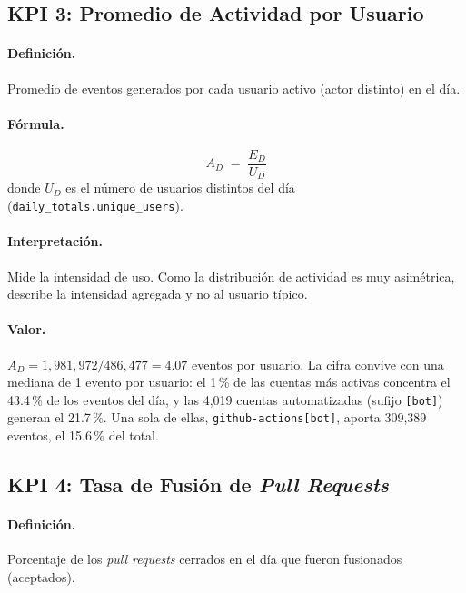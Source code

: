 
\subsection{KPI 3: Promedio de Actividad por Usuario}

\paragraph{Definición.} Promedio de eventos generados por cada usuario activo (actor distinto) en el día.

\paragraph{Fórmula.}
\[
A_D \;=\; \frac{E_D}{U_D}
\]
donde $U_D$ es el número de usuarios distintos del día (\texttt{daily\_totals.unique\_users}).

\paragraph{Interpretación.} Mide la intensidad de uso. Como la distribución de actividad es muy asimétrica, describe la intensidad agregada y no al usuario típico.

\paragraph{Valor.} $A_D = 1{,}981{,}972 / 486{,}477 = 4.07$ eventos por usuario. La cifra convive con una mediana de 1 evento por usuario: el 1\,\% de las cuentas más activas concentra el 43.4\,\% de los eventos del día, y las 4,019 cuentas automatizadas (sufijo \texttt{[bot]}) generan el 21.7\,\%. Una sola de ellas, \texttt{github-actions[bot]}, aporta 309,389 eventos, el 15.6\,\% del total.


\subsection{KPI 4: Tasa de Fusión de \textit{Pull Requests}}

\paragraph{Definición.} Porcentaje de los \textit{pull requests} cerrados en el día que fueron fusionados (aceptados).

